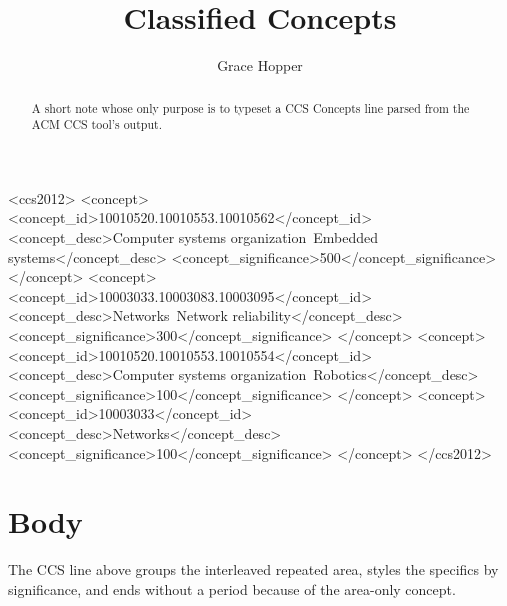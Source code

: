 \documentclass[acmsmall]{acmart}
\begin{document}
\title{Classified Concepts}

\author{Grace Hopper}

\begin{abstract}
  A short note whose only purpose is to typeset a CCS Concepts line parsed from the ACM CCS tool's output.
\end{abstract}

\begin{CCSXML}
<ccs2012>
 <concept>
  <concept_id>10010520.10010553.10010562</concept_id>
  <concept_desc>Computer systems organization~Embedded systems</concept_desc>
  <concept_significance>500</concept_significance>
 </concept>
 <concept>
  <concept_id>10003033.10003083.10003095</concept_id>
  <concept_desc>Networks~Network reliability</concept_desc>
  <concept_significance>300</concept_significance>
 </concept>
 <concept>
  <concept_id>10010520.10010553.10010554</concept_id>
  <concept_desc>Computer systems organization~Robotics</concept_desc>
  <concept_significance>100</concept_significance>
 </concept>
 <concept>
  <concept_id>10003033</concept_id>
  <concept_desc>Networks</concept_desc>
  <concept_significance>100</concept_significance>
 </concept>
</ccs2012>
\end{CCSXML}



\maketitle

\section{Body}
The CCS line above groups the interleaved repeated area, styles the specifics by significance, and ends without a period because of the area-only concept.
\end{document}
